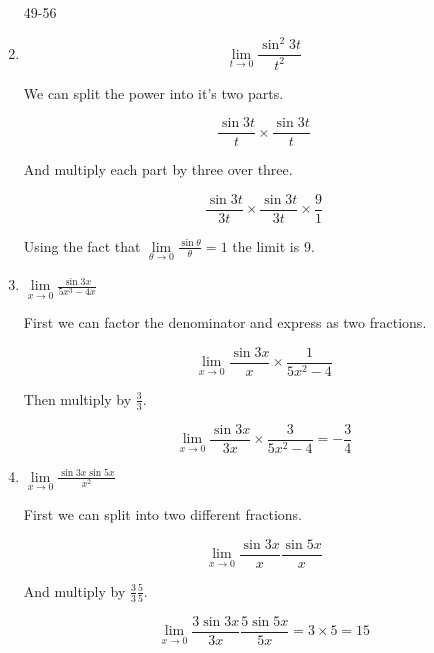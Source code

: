 \documentclass{article}
\begin{document}
\begin{enumerate}
		\item[49-56]

		\item $$\lim \limits _{t \to 0} \frac{\sin^2 3t}{t^2}$$

			We can split the power into it's two parts.

			$$\frac{\sin 3t}{t} \times \frac{\sin 3t}{t}$$

			And multiply each part by three over three.

			$$\frac{\sin3t}{3t} \times \frac{\sin 3t}{3t} \times \frac{9}{1}$$

			Using the fact that $\lim \limits _{\theta \to 0} \frac{\sin \theta}{\theta}  = 1$ the limit
			is 9.

		\item $\lim \limits _{x \to 0} \frac{\sin 3x}{5x^3 - 4x}$

			First we can factor the denominator and express as two fractions.

			$$\lim \limits _{x \to 0} \frac{\sin 3x}{x} \times \frac{1}{5x^2 - 4}$$

			Then multiply by $\frac{3}{3}$.

			$$\lim \limits _{x \to 0} \frac{\sin 3x}{3x} \times \frac{3}{5x^2 - 4} = -\frac{3}{4}$$

		\item $\lim \limits _{x \to 0} \frac{\sin 3x \sin 5x}{x^2}$

			First we can split into two different fractions.

			$$\lim \limits _{x \to 0} \frac{\sin3x}{x} \frac{\sin5x}{x}$$

			And multiply by $\frac{3}{3} \frac{5}{5}$.

			$$\lim \limits _{x \to 0} \frac{3\sin 3x}{3x} \frac{5 \sin 5x}{5x} = 3 \times 5 = 15$$
			
		
	\end{enumerate}
\end{document}
